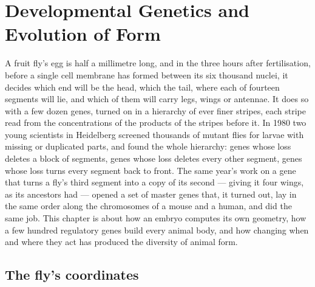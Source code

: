 \chapter{Developmental Genetics and Evolution of Form}\label{ch:b3:developmental-genetics}

A fruit fly's egg is half a millimetre long, and in the three hours
after fertilisation, before a single cell membrane has formed between
its six thousand nuclei, it decides which end will be the head, which
the tail, where each of fourteen segments will lie, and which of them
will carry legs, wings or antennae. It does so with a few dozen genes,
turned on in a hierarchy of ever finer stripes, each stripe read from
the concentrations of the products of the stripes before it. In 1980
two young scientists in Heidelberg screened thousands of mutant flies
for larvae with missing or duplicated parts, and found the whole
hierarchy: genes whose loss deletes a block of segments, genes whose
loss deletes every other segment, genes whose loss turns every segment
back to front. The same year's work on a gene that turns a fly's third
segment into a copy of its second --- giving it four wings, as its
ancestors had --- opened a set of master genes that, it turned out,
lay in the same order along the chromosomes of a mouse and a human,
and did the same job. This chapter is about how an embryo computes its
own geometry, how a few hundred regulatory genes build every animal
body, and how changing when and where they act has produced the
diversity of animal form.

\section{The fly's coordinates}

